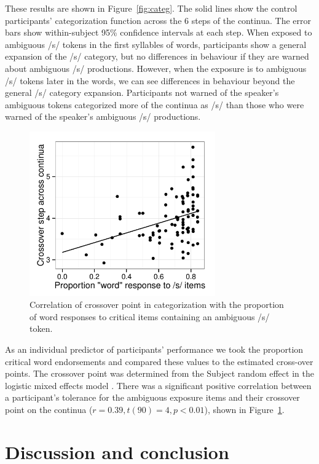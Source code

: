 \documentclass[a4paper,11pt,twocolumn]{article}
\begin{document}
These results are shown in Figure~\ref{fig:categ}.  The solid lines show the control participants' categorization function across the 6 steps of the continua.  The error bars show within-subject 95\% confidence intervals at each step.  When exposed to ambiguous /s/ tokens in the first syllables of words, participants show a general expansion of the /s/ category, but no differences in behaviour if they are warned about ambiguous /s/ productions.  However, when the exposure is to ambiguous /s/ tokens later in the words, we can see differences in behaviour beyond the general /s/ category expansion.  Participants not warned of the speaker's ambiguous tokens categorized more of the continua as /s/ than those who were warned of the speaker's ambiguous /s/ productions.

\begin{figure}[!ht]

\caption{Correlation of crossover point in categorization with the proportion of word responses to critical items containing an ambiguous /s/ token.}\label{fig:xover}
\begin{center}
\includegraphics[width=80mm]{xoverwordresp}
\end{center}
\end{figure}

As an individual predictor of participants' performance we took the proportion critical word endorsements and compared these values to the estimated cross-over points. The crossover point was determined from the Subject random effect in the logistic mixed effects model \cite{Kleber2011}. There was a significant positive correlation between a participant's tolerance for the ambiguous exposure items and their crossover point on the continua ($r = 0.39, t (90) = 4, p < 0.01$), shown in Figure~\ref{fig:xover}.

\section{Discussion and conclusion}
\end{document}
